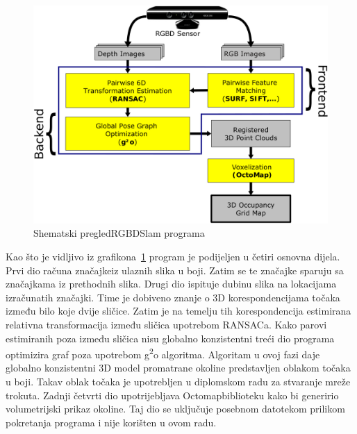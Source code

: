 \begin{figure}[h]
\renewcommand{\figurename}{Grafikon}
\centering
\includegraphics[scale=0.27]{figures/rgbdslam-overview.png}
\caption[]{Shematski pregled\footnotemark[1] RGBDSlam programa}
\label{fig:rgbdslam-overview}
\end{figure}


Kao što je vidljivo iz grafikona~\ref{fig:rgbdslam-overview} program je
podijeljen u četiri osnovna dijela. Prvi dio računa
značajke\footnotemark[2] iz ulaznih slika u boji. Zatim se te značajke
sparuju sa značajkama iz prethodnih slika. Drugi dio ispituje dubinu
slika na lokacijama izračunatih značajki. Time je dobiveno znanje o 
3D korespondencijama točaka između bilo koje dvije sličice. Zatim je na
temelju tih korespondencija estimirana relativna transformacija između
sličica upotrebom RANSACa\footnotemark[3]. Kako parovi estimiranih poza
između sličica nisu globalno konzistentni treći dio programa optimizira
graf poza upotrebom g\textsuperscript{2}o algoritma\footnotemark[4].
Algoritam u ovoj fazi daje globalno konzistentni 3D model promatrane
okoline predstavljen oblakom točaka u boji. Takav oblak točaka je
upotrebljen u diplomskom radu za stvaranje mreže trokuta. Zadnji četvrti
dio upotrijebljava Octomap\footnotemark[5] biblioteku kako bi generirio
volumetrijski prikaz okoline. Taj dio se uključuje posebnom datotekom
prilikom pokretanja programa i nije korišten u ovom radu.

